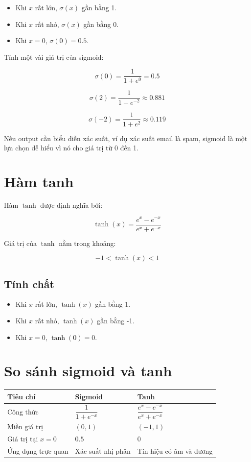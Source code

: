 \documentclass[12pt,a4paper]{report}
\begin{document}
\begin{itemize}
    \item Khi $x$ rất lớn, $\sigma(x)$ gần bằng 1.
    \item Khi $x$ rất nhỏ, $\sigma(x)$ gần bằng 0.
    \item Khi $x=0$, $\sigma(0)=0.5$.
\end{itemize}

\begin{vidu}
Tính một vài giá trị của sigmoid:

\[
    \sigma(0)=\frac{1}{1+e^0}=0.5
\]

\[
    \sigma(2)=\frac{1}{1+e^{-2}}\approx 0.881
\]

\[
    \sigma(-2)=\frac{1}{1+e^2}\approx 0.119
\]

Nếu output cần biểu diễn xác suất, ví dụ xác suất email là spam, sigmoid là một lựa chọn dễ hiểu vì nó cho giá trị từ 0 đến 1.
\end{vidu}

\section{Hàm tanh}

Hàm $\tanh$ được định nghĩa bởi:

\[
    \tanh(x) = \frac{e^x-e^{-x}}{e^x+e^{-x}}
\]

Giá trị của $\tanh$ nằm trong khoảng:

\[
    -1 < \tanh(x) < 1
\]

\subsection{Tính chất}

\begin{itemize}
    \item Khi $x$ rất lớn, $\tanh(x)$ gần bằng 1.
    \item Khi $x$ rất nhỏ, $\tanh(x)$ gần bằng -1.
    \item Khi $x=0$, $\tanh(0)=0$.
\end{itemize}

\section{So sánh sigmoid và tanh}

\begin{center}
\begin{tabular}{lll}
\toprule
Tiêu chí & Sigmoid & Tanh \\
\midrule
Công thức & $\dfrac{1}{1+e^{-x}}$ & $\dfrac{e^x-e^{-x}}{e^x+e^{-x}}$ \\
Miền giá trị & $(0,1)$ & $(-1,1)$ \\
Giá trị tại $x=0$ & $0.5$ & $0$ \\
Ứng dụng trực quan & Xác suất nhị phân & Tín hiệu có âm và dương \\
\bottomrule
\end{tabular}
\end{center}
\end{document}
